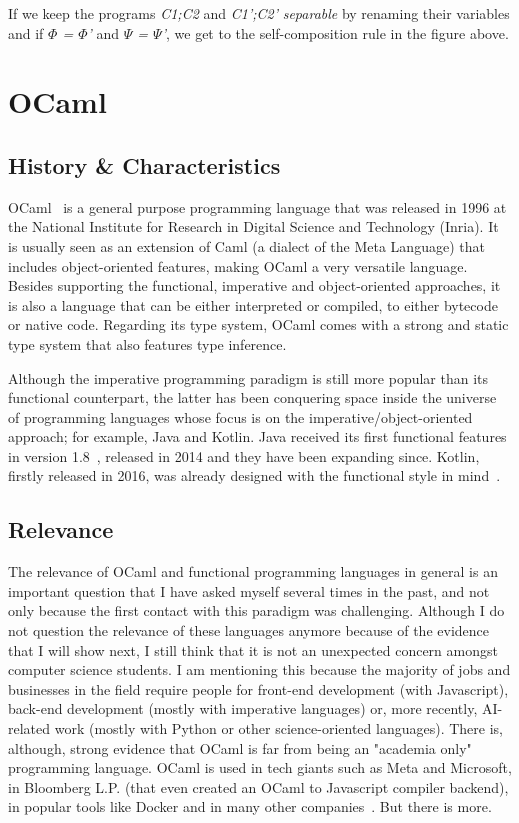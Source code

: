 If we keep the programs \emph{C1;C2} and \emph{C1';C2'} \emph{separable} by renaming their variables and if \emph{$\Phi$ = $\Phi$'} and \emph{$\Psi$ = $\Psi$'}, we get to the self-composition rule in the figure above.


\section{OCaml}
\label{sec:ocaml}

\subsection{History \& Characteristics} 
\label{sub:overview}

OCaml~\cite{ocaml} is a general purpose programming language that was released in 1996 at the National Institute for Research in Digital Science and Technology (Inria).
It is usually seen as an extension of Caml (a dialect of the Meta Language) that includes object-oriented features, making OCaml a very versatile language.
Besides supporting the functional, imperative and object-oriented approaches, it is also a language that can be either interpreted or compiled, to either bytecode or native code.
Regarding its type system, OCaml comes with a strong and static type system that also features type inference.

Although the imperative programming paradigm is still more popular than its functional counterpart, the latter has been conquering space inside the universe of programming languages whose focus is on the imperative/object-oriented approach; for example, Java and Kotlin.
Java received its first functional features in version 1.8~\cite{java}, released in 2014 and they have been expanding since.
Kotlin, firstly released in 2016, was already designed with the functional style in mind~\cite{kotlin}.


\subsection{Relevance} 
\label{sub:relevance}

The relevance of OCaml and functional programming languages in general is an important question that I have asked myself several times in the past, and not only because the first contact with this paradigm was challenging.
Although I do not question the relevance of these languages anymore because of the evidence that I will show next, I still think that it is not an unexpected concern amongst computer science students.
I am mentioning this because the majority of jobs and businesses in the field require people for front-end development (with Javascript), back-end development (mostly with imperative languages) or, more recently, AI-related work (mostly with Python or other science-oriented languages).
There is, although, strong evidence that OCaml is far from being an "academia only" programming language.
OCaml is used in tech giants such as Meta and Microsoft, in Bloomberg L.P. (that even created an OCaml to Javascript compiler backend), in popular tools like Docker and in many other companies~\cite{ocaml_companies}.
But there is more.


